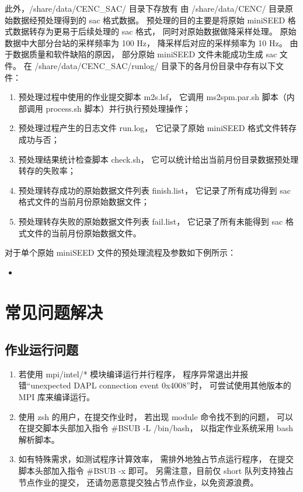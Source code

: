 \documentclass[UTF8]{ctexart}
\newcommand{\mynote}[1]{\colorbox{gray!35}{#1}}
\newcommand{\mynnote}[1]{\colorbox{gray!15}{\color{blue!65}#1}}
\newcommand{\insertbash}[2]{\begin{itemize}\item[]\end{itemize}}
\begin{document}
此外，/share/data/CENC\_SAC/ 目录下存放有
由 /share/data/CENC/ 目录原始数据经预处理得到的 sac 格式数据。
预处理的目的主要是将原始 miniSEED 格式数据转存为更易于后续处理的 sac 格式，
同时对原始数据做降采样处理。
原始数据中大部分台站的采样频率为 100 Hz，
降采样后对应的采样频率为 10 Hz。
由于数据质量和软件缺陷的原因，
部分原始 miniSEED 文件未能成功生成 sac 文件。
在 /share/data/CENC\_SAC/runlog/ 目录下的各月份目录中存有以下文件：
\begin{enumerate}[\hspace{15mm}（1）]
  \item 预处理过程中使用的作业提交脚本 \mynote{m2s.lsf}，
    它调用 ms2spm.par.sh 脚本（内部调用 process.sh 脚本）并行执行预处理操作；
  \item 预处理过程产生的日志文件 \mynote{run.log}，
    它记录了原始 miniSEED 格式文件转存成功与否；
  \item 预处理结果统计检查脚本 \mynote{check.sh}，
    它可以统计给出当前月份目录数据预处理转存的失败率；
  \item 预处理转存成功的原始数据文件列表 \mynote{finish.list}，
    它记录了所有成功得到 sac 格式文件的当前月份原始数据文件；
  \item 预处理转存失败的原始数据文件列表 \mynote{fail.list}，
    它记录了所有未能得到 sac 格式文件的当前月份原始数据文件。
\end{enumerate}

对于单个原始 miniSEED 文件的预处理流程及参数如下例所示：
\insertbash{material/cencpp.sh}{CENC 波形数据预处理示例}

\section{常见问题解决}
\subsection{作业运行问题}
\begin{enumerate}[\hspace{10mm}1、]
  \item 若使用 mpi/intel/* 模块编译运行并行程序，
    程序异常退出并报错“unexpected DAPL connection event 0x4008”时，
    可尝试使用其他版本的 MPI 库来编译运行。
  \item 使用 zsh 的用户，在提交作业时，
    若出现 module 命令找不到的问题，
    可以在提交脚本头部加入指令 \mynnote{\#BSUB -L /bin/bash}，
    以指定作业系统采用 bash 解析脚本。
  \item 如有特殊需求，如测试程序计算效率，
    需排外地独占节点运行程序，
    在提交脚本头部加入指令 \mynnote{\#BSUB -x} 即可。
    另需注意，目前仅 short 队列支持独占节点作业的提交，
    还请勿恶意提交独占节点作业，以免资源浪费。
\end{enumerate}
\end{document}
